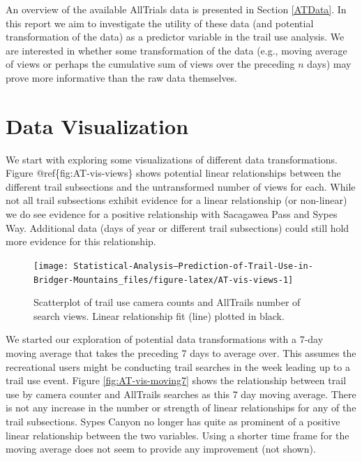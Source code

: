 \documentclass[
]{book}
\begin{document}
An overview of the available AllTrials data is presented in Section \ref{ATData}. In this report we aim to investigate the utility of these data (and potential transformation of the data) as a predictor variable in the trail use analysis. We are interested in whether some transformation of the data (e.g., moving average of views or perhaps the cumulative sum of views over the preceding \(n\) days) may prove more informative than the raw data themselves.

\hypertarget{data-visualization}{%
\section{Data Visualization}\label{data-visualization}}

We start with exploring some visualizations of different data transformations. Figure @ref\{fig:AT-vis-views\} shows potential linear relationships between the different trail subsections and the untransformed number of views for each. While not all trail subsections exhibit evidence for a linear relationship (or non-linear) we do see evidence for a positive relationship with Sacagawea Pass and Sypes Way. Additional data (days of year or different trail subsections) could still hold more evidence for this relationship.

\begin{figure}

{\centering \texttt{[image: Statistical-Analysis--Prediction-of-Trail-Use-in-Bridger-Mountains\_files/figure-latex/AT-vis-views-1]} 

}

\caption{Scatterplot of trail use camera counts and AllTrails number of search views. Linear relationship fit (line) plotted in black.}\label{fig:AT-vis-views}
\end{figure}

We started our exploration of potential data transformations with a 7-day moving average that takes the preceding 7 days to average over. This assumes the recreational users might be conducting trail searches in the week leading up to a trail use event. Figure \ref{fig:AT-vis-moving7} shows the relationship between trail use by camera counter and AllTrails searches as this 7 day moving average. There is not any increase in the number or strength of linear relationships for any of the trail subsections. Sypes Canyon no longer has quite as prominent of a positive linear relationship between the two variables. Using a shorter time frame for the moving average does not seem to provide any improvement (not shown).
\end{document}
